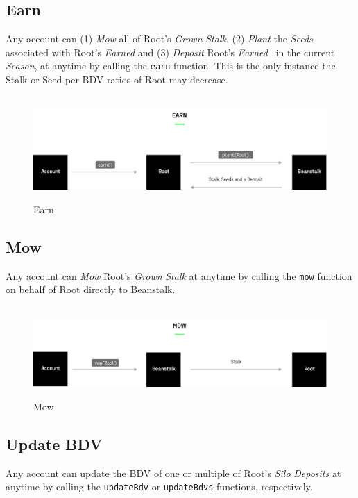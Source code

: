 \documentclass[tikz]{article}
\newcommand{\code}[1]{\texttt{#1}}
\newcommand{\term}[1]{\textsl{#1}}
\newcommand{\Bean}{} %
\begin{document}
\subsection{Earn}
Any account can (1) \term{Mow} all of Root's \term{Grown} \term{Stalk}, (2) \term{Plant} the \term{Seeds} associated with Root's \term{Earned} \Bean and (3) \term{Deposit} Root's \term{Earned} \Bean\ in the current \term{Season}, at anytime by calling the \code{earn} function. This is the only instance the Stalk or Seed per BDV ratios of Root may decrease. 

\begin{figure}[h!]
    \centering
    \hbox{\hspace{1mm} \includegraphics[scale=0.8]{Figure3}}
    \caption{Earn}
    \label{fig 3}
\end{figure}

\newpage
\subsection{Mow}
Any account can \term{Mow} Root's \term{Grown} \term{Stalk} at anytime by calling the \code{mow} function on behalf of Root directly to Beanstalk.

\begin{figure}[h!]
    \centering
    \hbox{\hspace{1mm} \includegraphics[scale=0.8]{Figure4}}
    \caption{Mow}
    \label{fig 4}
\end{figure}

\subsection{Update BDV}
Any account can update the BDV of one or multiple of Root's \term{Silo} \term{Deposits} at anytime by calling the \code{updateBdv} or \code{updateBdvs} functions, respectively. 
\end{document}

